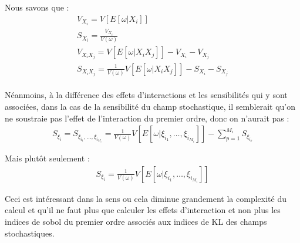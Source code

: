 \documentclass[a4paper,10pt]{article}
\begin{document}
Nous savons que : 
\begin{align}
V_{X_{i}} = V[E[\omega|X_{i}]] \\
S_{X_{i}} = \frac{V_{X_{i}}}{V(\omega)} \\
V_{X_{i}X_{j}} = V[E[\omega|X_{i}X_{j}]] - V_{X_{i}} - V_{X_{j}} \\
S_{X_{i}X_{j}} = \frac{1}{V(\omega)}V[E[\omega|X_{i}X_{j}]] - S_{X_{i}} - S_{X_{j}}
\end{align} \\

Néanmoins, à la différence des effets d'interactions et les sensibilités qui y sont associées, dans la cas de la sensibilité du champ stochastique, il semblerait qu'on ne soustraie pas l'effet de l'interaction du premier ordre, donc on n'aurait pas :
\begin{align}
S_{\xi_{i}} = S_{\xi_{i_{1}},\ldots,\xi_{i_{M_{i}}}} = \frac{1}{V(\omega)}V[E[\omega|\xi_{i_{1}},\ldots,\xi_{i_{M_{i}}}]] - \sum_{p=1}^{M_{i}}S_{\xi_{i_{p}}}
\end{align}

Mais plutôt seulement : 
\begin{align}
S_{\xi_{i}} = \frac{1}{V(\omega)}V[E[\omega|\xi_{i_{1}},\ldots,\xi_{i_{M_{i}}}]]
\end{align}

Ceci est intéressant dans la sens ou cela diminue grandement la complexité du calcul et qu'il ne faut plus que calculer les effets d'interaction et non plus les indices de sobol du premier ordre associés aux indices de KL des champs stochastiques. 


\end{document}
